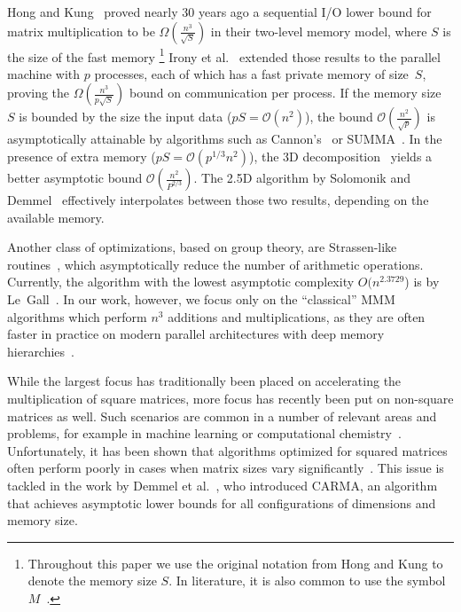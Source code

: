 \documentclass[sigplan,review,anonymous]{acmart}\settopmatter{printfolios=true,printccs=false,printacmref=false}
\newcommand\mac[1]{\textcolor{red}{[Mac: #1]}}
\begin{document}
Hong and Kung~\cite{redblue} proved nearly 30 years ago a sequential I/O lower
bound for matrix multiplication to be $\Omega\left(\frac{n^3}{\sqrt{S}}\right)$
in their two-level memory model, where $S$
is the size of the fast memory
%
\footnote{Throughout this paper we use the original notation from Hong and Kung 
to denote the memory size $S$. In literature, it is also common to use the 
symbol $M$~\cite{externalMem,IronyMMM, parallelExMem}.} 
	Irony et al.~\cite{IronyMMM} extended those
results to the parallel machine with $p$ processes,
each of which has a fast private memory of size~$S$, proving the
$\Omega\left(\frac{n^3}{p\sqrt{S}}\right)$ bound on communication per process.
%
%
If the memory size~$S$ is bounded by the size the
input data ($pS = \mathcal{O}(n^2)$), the bound
$\mathcal{O}\left(\frac{n^2}{\sqrt{p}}\right)$  is asymptotically attainable by
algorithms such as Cannon's~\cite{Cannon} or SUMMA~\cite{summa}. In the
presence of extra memory ($pS = \mathcal{O}(p^{1/3} n^2)$), the 3D
decomposition~\cite{summa3d} yields a better asymptotic bound
$\mathcal{O}\left(\frac{n^2}{P^{2/3}}\right)$. The 2.5D algorithm by Solomonik
and Demmel~\cite{25d} effectively interpolates
between those two results, depending on the available
memory.

Another class of optimizations, based on group theory,
are Strassen-like routines~\cite{Strassen}, which asymptotically reduce the
number of arithmetic operations. Currently, the algorithm with the lowest
asymptotic complexity $O(n^{2.3729}$) is by Le~Gall~\cite{LeGall}. In our work,
however, we focus only on the ``classical'' MMM algorithms which perform $n^3$
additions and multiplications, as they are often faster in practice on modern 
parallel architectures with deep memory hierarchies~\cite{strassenVsClassic}.  

While the largest focus has traditionally been
placed on accelerating the multiplication of square matrices, more focus has
recently been put on
non-square matrices as well. Such scenarios are common in a number of
relevant areas and problems, for example in machine learning
\cite{rectangularML} or computational chemistry~\cite{rectangularChemistry}.
%
Unfortunately, it has been shown
that algorithms optimized for squared matrices often perform poorly in cases
when matrix sizes vary significantly~\cite{CARMA}. 
%
This issue is tackled in the work by Demmel et al.~\cite{CARMA}, who introduced
CARMA, an algorithm that achieves asymptotic lower bounds for all
configurations of dimensions and memory size.  
\end{document}
